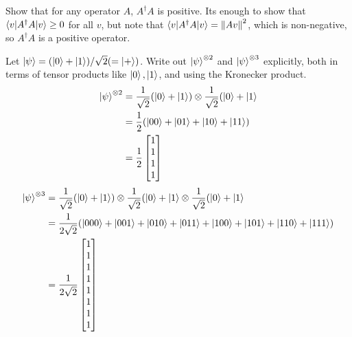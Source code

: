  Show that for any operator $A$, $A^\dagger A$ is positive.
\Soln Its enough to show that $\braket{v | A^\dagger A|v} \geq 0$ for all $v$, but note that $\braket{v| A^\dagger A|v} = \left\lVert Av\right\rVert^2$, which is non-negative, so $A^\dagger A$ is a positive operator.

 Let $\ket{\psi}=(\ket{0}+\ket{1})/\sqrt{2}(=\ket{+})$. Write out $\ket{\psi}^{\otimes2}$ and $\ket{\psi}^{\otimes3}$ explicitly, both in terms of tensor products like $\ket{0},\ket{1}$, and using the Kronecker product.
\Soln
\begin{align*}
	\ket{\psi}^{\otimes 2} &= \frac{1}{\sqrt{2}} (\ket{0} + \ket{1}) \otimes \frac{1}{\sqrt{2}} (\ket{0} + \ket{1}\\
		&= \frac{1}{2} (\ket{00}  + \ket{01} + \ket{10} + \ket{11}  )\\
		&= \frac{1}{2} \begin{bmatrix}
			1 \\
			1 \\
			1 \\
			1
		\end{bmatrix}
\end{align*}
\begin{align*}
	\ket{\psi}^{\otimes 3} &= \frac{1}{\sqrt{2}} (\ket{0} + \ket{1}) \otimes \frac{1}{\sqrt{2}} (\ket{0} + \ket{1}  \otimes \frac{1}{\sqrt{2}} (\ket{0} + \ket{1}\\
		&= \frac{1}{2\sqrt{2}} (\ket{000}  + \ket{001} + \ket{010} + \ket{011} +  \ket{100}  + \ket{101} + \ket{110} + \ket{111})\\
		&= \frac{1}{2\sqrt{2}} \begin{bmatrix}
			1 \\
			1 \\
			1 \\
			1 \\
			1 \\
			1 \\
			1 \\
			1
		\end{bmatrix}
\end{align*}

